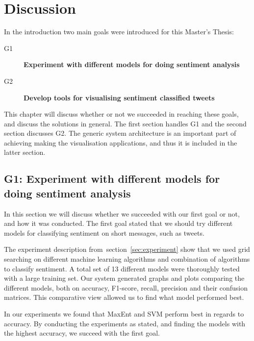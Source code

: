 \chapter{Discussion}

In the introduction two main goals were introduced for this Master's Thesis:

\begin{description}

\item[G1] \textbf{Experiment with different models for doing sentiment analysis}
	
\item[G2] \textbf{Develop tools for visualising sentiment classified tweets}

\end{description}

This chapter will discuss whether or not we succeeded in reaching these goals, and discuss the solutions in general. The first section handles G1 and the second section discusses G2. The generic system architecture is an important part of achieving making the visualisation applications, and thus it is included in the latter section.

\section{G1: Experiment with different models for doing sentiment analysis}

In this section we will discuss whether we succeeded with our first goal or not, and how it was conducted. The first goal stated that we should try different models for classifying sentiment on short messages, such as tweets. 

The experiment description from~section~\ref{sec:experiment} show that we used grid searching on different machine learning algorithms and combination of algorithms to classify sentiment. A total set of 13 different models were thoroughly tested with a large training set. Our system generated graphs and plots comparing the different models, both on accuracy, F1-score, recall, precision and their confusion matrices. This comparative view allowed us to find what model performed best.

In our experiments we found that MaxEnt and SVM perform best in regards to accuracy. By conducting the experiments as stated, and finding the models with the highest accuracy, we succeed with the first goal.


